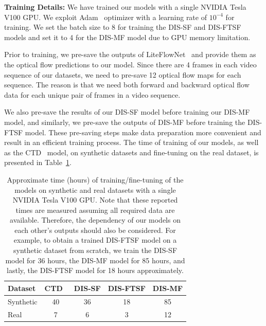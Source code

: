 \bigbreak\noindent\textbf{Training Details:} We have trained our models with a single NVIDIA Tesla V100 GPU. We exploit Adam~\citep{adam} optimizer with a learning rate of $10^{-4}$ for training. We set the batch size to 8 for training the DIS-SF and DIS-FTSF models and set it to 4 for the DIS-MF model due to GPU memory limitation.

Prior to training, we pre-save the outputs of LiteFlowNet~\citep{hui2018liteflownet} and provide them as the optical flow predictions to our model. Since there are 4 frames in each video sequence of our datasets, we need to pre-save 12 optical flow maps for each sequence. The reason is that we need both forward and backward optical flow data for each unique pair of frames in a video sequence.

We also pre-save the results of our DIS-SF model before training our DIS-MF model, and similarly, we pre-save the outputs of DIS-MF before training the DIS-FTSF model. These pre-saving steps make data preparation more convenient and result in an efficient training process. The time of training of our models, as well as the CTD~\citep{riegler2019connecting} model, on synthetic datasets and fine-tuning on the real dataset, is presented in Table~\ref{table:train_time_supp}.

\begin{table}[t]
    \begin{center}
        \begin{tabular}{lcccc}
        \hline
        Dataset & CTD~\citep{riegler2019connecting} & DIS-SF & DIS-FTSF & DIS-MF \\
        \hline
        Synthetic & 40 & 36 & 18 & 85 \\
        Real & 7 & 6 & 3 & 12\\
        \hline
        \end{tabular}
    \end{center}
    \caption{Approximate time (hours) of training/fine-tuning of the models on synthetic and real datasets with a single NVIDIA Tesla V100 GPU. Note that these reported times are measured assuming all required data are available. Therefore, the dependency of our models on each other's outputs should also be considered. For example, to obtain a trained DIS-FTSF model on a synthetic dataset from scratch, we train the DIS-SF model for 36 hours, the DIS-MF model for 85 hours, and lastly, the DIS-FTSF model for 18 hours approximately.}
    \label{table:train_time_supp}
\end{table}

